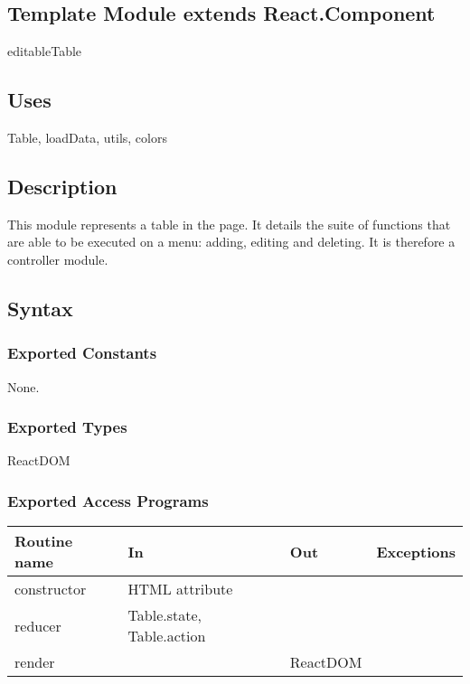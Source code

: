 \documentclass[12pt, titlepage]{article}
\begin{document}
\subsection{Template Module extends React.Component}

editableTable

\subsection{Uses}

Table, loadData, utils, colors

\subsection{Description}
This module represents a table in the page. It details the suite of functions that are able to be executed on a menu: adding, editing and deleting. It is therefore a controller module.

\subsection{Syntax}

\subsubsection{Exported Constants}

None.

\subsubsection{Exported Types}

ReactDOM

\subsubsection{Exported Access Programs}

\begin{tabular}{| l | l | l | l |}
  \hline
  \textbf{Routine name} & \textbf{In} & \textbf{Out} & \textbf{Exceptions}\\
  \hline
  constructor & HTML attribute & ~ & ~\\
  \hline
  reducer & Table.state, Table.action & ~ & ~\\
  \hline
  render & ~ & ReactDOM & ~\\
  \hline
\end{tabular}
\end{document}
